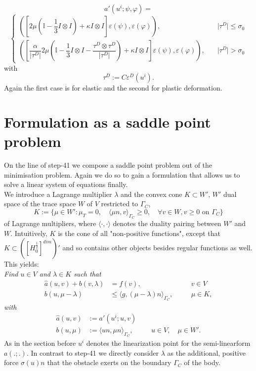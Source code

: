 \documentclass{article}
\begin{document}
$$a'(u^i;\psi,\varphi) =$$
$$
\begin{cases}
\left(\left[2\mu\left(\mathbb{I}  - \dfrac{1}{3} I\otimes I\right) + \kappa I\otimes I\right]\varepsilon(\psi),\varepsilon(\varphi)\right), & \quad
      \vert \tau^D \vert \leq \sigma_0\\
\left(\left[\dfrac{\alpha}{\vert\tau^D\vert}2\mu\left(\mathbb{I}  - \dfrac{1}{3} I\otimes I - \dfrac{\tau^D\otimes\tau^D}{\vert\tau^D\vert}\right) +
      \kappa I\otimes I\right]\varepsilon(\psi),\varepsilon(\varphi) \right), &
 \quad \vert \tau^D \vert > \sigma_0
\end{cases}
$$
with
$$\tau^D :=  C\varepsilon^D(u^i).$$
Again the first case is for elastic and the second for plastic deformation.

\section{Formulation as a saddle point problem}

On the line of step-41 we compose a saddle point problem out of the minimisation problem. Again we do so to gain a formulation
that allows us to solve a linear system of equations finally.\\
We introduce a Lagrange multiplier $\lambda$ and the convex cone $K\subset W'$,
$W'$ dual space of the trace space $W$ of $V$ restricted to $\Gamma_C$,
$$K:=\{\mu\in W':\mu_T = 0,\quad\langle\mu n,v\rangle_{\Gamma_C}\geq 0,\quad
\forall v\in W, v \ge 0\text{ on }\Gamma_C \}$$
of Lagrange multipliers, where $\langle\cdot,\cdot\rangle$
denotes the duality pairing between $W'$ and $W$. Intuitively, $K$ is the cone
of all "non-positive functions", except that $ K\subset
\left( \left[ H_0^{\frac{1}{2}} \right]^{dim} \right)' $ and so contains other
objects besides regular functions as well. This yields:\\

\noindent
\textit{Find $u\in V$ and $\lambda\in K$ such that}
\begin{align*}
 \hat{a}(u,v) + b(v,\lambda) &= f(v),\quad &&v\in V\\
 b(u,\mu - \lambda) &\leq \langle g,(\mu -
 \lambda)n\rangle_{\Gamma_C},\quad&&\mu\in K,
\end{align*}
\textit{with}
\begin{align*}
 \hat{a}(u,v) &:= a'(u^i;u,v)\\
 b(u,\mu) &:= \langle un,\mu n\rangle_{\Gamma_C},\quad &&u\in V,\quad\mu\in W'.
\end{align*}
As in the section before $u^i$ denotes the linearization point for the
semi-linearform $a(.;.)$. In contrast to step-41 we directly consider $\lambda$
as the additional, positive force $\sigma(u)n$ that the obstacle
exerts on the boundary $\Gamma_C$ of the body.\\
\end{document}
